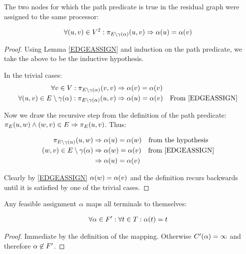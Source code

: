 \begin{lemma}
\label{PATHASSIGN}
The two nodes for which the path predicate is true in the residual graph were assigned to the same processor:

\begin{align}
	\nonumber \forall (u, v) \in V^2 : \pi_{E \setminus \gamma(\alpha)}(u, v) \Rightarrow \alpha(u) = \alpha(v)
\end{align}
\end{lemma}
\begin{proof}
Using Lemma \ref{EDGEASSIGN} and induction on the path predicate, we take the above to be the inductive hypothesis.

In the trivial cases:
\begin{align}
	\nonumber \forall v \in V : \pi_{E \setminus \gamma(\alpha)}(v, v) & \Rightarrow \alpha(v) = \alpha(v) \\
	\nonumber \forall (u, v) \in E \setminus \gamma(\alpha) : \pi_{E \setminus \gamma(\alpha)}(u, v) & \Rightarrow \alpha(u) = \alpha(v) \quad \mbox{From \ref{EDGEASSIGN}}
\end{align}

Now we draw the recursive step from the definition of the path predicate: $\pi_{E}(u, w) \wedge (w,v) \in E \Rightarrow \pi_{E}(u, v)$.
Thus:

\begin{align}
	\nonumber \pi_{E \setminus \gamma(\alpha)}(u, w) & \Rightarrow \alpha(u) = \alpha (w) \quad \mbox{from the hypothesis}\\
	\nonumber (w, v) \in E \setminus \gamma(\alpha) & \Rightarrow \alpha(w) = \alpha(v) \quad \mbox{from \ref{EDGEASSIGN}}\\
	\nonumber & \Rightarrow \alpha(u) = \alpha(v)
\end{align}

Clearly by \ref{EDGEASSIGN} $\alpha(w) = \alpha(v)$ and the definition recurs backwards until it is satisfied by one of the trivial cases.

\end{proof}

\begin{lemma}
\label{FORCEASSIGN}
Any feasible assignment $\alpha$ maps all terminals to themselves:

\begin{align}
	\nonumber \forall \alpha \in F' : \forall t \in T : \alpha(t) = t
\end{align}
\end{lemma}
\begin{proof}
Immediate by the definition of the mapping.
Otherwise $C'(\alpha) = \infty$ and therefore $\alpha \not\in F'$.
\end{proof}

